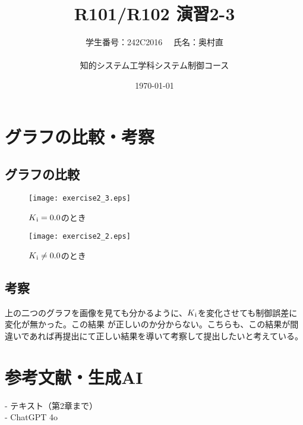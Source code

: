 \documentclass[10pt,a4paper,titlepage]{jreport} %
\title{R101/R102 演習2-3} %
\author{
  学生番号：242C2016 　氏名：奥村直 \\
  \\
  知的システム工学科システム制御コース
  } %
\date{\today} %
\begin{document}
\maketitle
\chapter{グラフの比較・考察}
\section{グラフの比較}
\begin{figure}[htbp]
  \centering
  \texttt{[image: exercise2\_3.eps]}
  \caption{$K\textsubscript{i} = 0.0$のとき}
\end{figure}

\begin{figure}[htbp]
  \centering
  \texttt{[image: exercise2\_2.eps]}
  \caption{$K\textsubscript{i} \neq 0.0$のとき}
\end{figure}

\section{考察}
上の二つのグラフを画像を見ても分かるように、$K\textsubscript{i}$を変化させても制御誤差に変化が無かった。この結果
が正しいのか分からない。こちらも、この結果が間違いであれば再提出にて正しい結果を導いて考察して提出したいと考えている。

\chapter{参考文献・生成AI}

- テキスト（第2章まで）\\
- ChatGPT 4o
\end{document}
